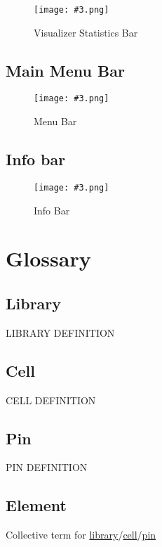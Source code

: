 \documentclass[10pt,a4paper]{report}
\newcommand{\refer}[2]{\hyperref[#1]{\textcolor{col:reference}{#2}}}
\newcommand{\defg}[3]{\label{glo:#1}\section{#2}#3\\}
\newcommand{\refg}[2]{\refer{glo:#1}{#2}}
\newcommand{\includeimage}[5]{
    \begin{figure}[H]
        #1
        \texttt{[image: \#3.png]}
        \caption{#4}
        \label{fig:#5}
    \end{figure}
}
\begin{document}
\includeimage{}{0.4}{Visualizer Statistics Bar}{Visualizer Statistics Bar}{visualizer_statistics_bar}

\section{Main Menu Bar}
\label{sec:menu}

\includeimage{}{0.4}{Menu Bar}{Menu Bar}{menu_bar}

\section{Info bar}
\label{sec:info}

\includeimage{}{0.4}{Info Bar}{Info Bar}{info_bar}

\chapter{Glossary}
\defg{library}{Library}{
    LIBRARY DEFINITION
}
\defg{cell}{Cell}{
    CELL DEFINITION
}
\defg{pin}{Pin}{
    PIN DEFINITION
}
\defg{element}{Element}{
    Collective term for \refg{library}{library}/\refg{cell}{cell}/\refg{pin}{pin}
}
\end{document}
